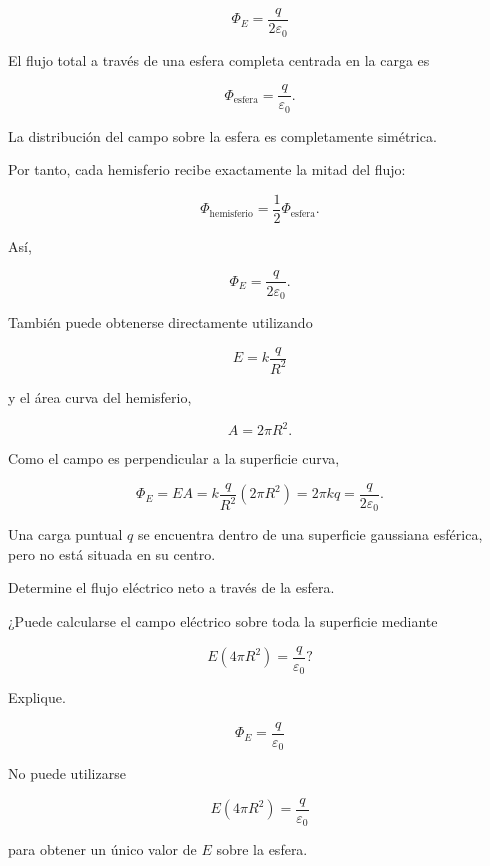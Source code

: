 \begin{respuesta}

\[
\boxed{
\Phi_E=\frac{q}{2\varepsilon_0}
}
\]

\end{respuesta}

\begin{explicacion}

El flujo total a través de una esfera completa centrada en la carga es

\[
\Phi_{\text{esfera}}
=
\frac{q}{\varepsilon_0}.
\]

La distribución del campo sobre la esfera es completamente simétrica.

Por tanto, cada hemisferio recibe exactamente la mitad del flujo:

\[
\Phi_{\text{hemisferio}}
=
\frac12\Phi_{\text{esfera}}.
\]

Así,

\[
\boxed{
\Phi_E=\frac{q}{2\varepsilon_0}
}.
\]

También puede obtenerse directamente utilizando

\[
E=k\frac{q}{R^2}
\]

y el área curva del hemisferio,

\[
A=2\pi R^2.
\]

Como el campo es perpendicular a la superficie curva,

\[
\Phi_E=EA
=
k\frac{q}{R^2}(2\pi R^2)
=
2\pi kq
=
\frac{q}{2\varepsilon_0}.
\]

\end{explicacion}


\begin{ejercicio}

Una carga puntual \(q\) se encuentra dentro de una superficie gaussiana esférica,
pero no está situada en su centro.

Determine el flujo eléctrico neto a través de la esfera.

¿Puede calcularse el campo eléctrico sobre toda la superficie mediante

\[
E(4\pi R^2)=\frac{q}{\varepsilon_0}?
\]

Explique.

\end{ejercicio}

\begin{respuesta}

\[
\boxed{
\Phi_E=\frac{q}{\varepsilon_0}
}
\]

No puede utilizarse

\[
E(4\pi R^2)=\frac{q}{\varepsilon_0}
\]

para obtener un único valor de \(E\) sobre la esfera.

\end{respuesta}

